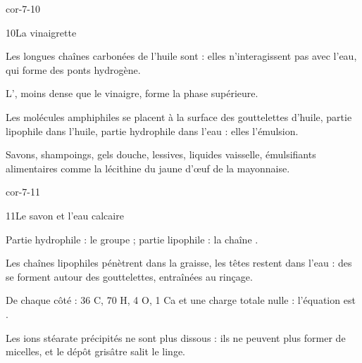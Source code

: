 \begin{blocLivre}{cor-7-10}
\begin{corrige}{10}{La vinaigrette}
\begin{questions}
\item Les longues chaînes carbonées de l'huile sont  : elles n'interagissent pas avec l'eau, qui forme des ponts
hydrogène.
\item L', moins dense que le vinaigre, forme la phase supérieure.
\item Les molécules amphiphiles se placent à la surface des gouttelettes d'huile, partie lipophile dans l'huile, partie
hydrophile dans l'eau : elles  l'émulsion.
\item Savons, shampoings, gels douche, lessives, liquides vaisselle, émulsifiants alimentaires comme la lécithine du jaune
d'œuf de la mayonnaise.
\end{questions}
\end{corrige}
\end{blocLivre}
\begin{blocLivre}{cor-7-11}
\begin{corrige}{11}{Le savon et l'eau calcaire}
\begin{questions}
\item Partie hydrophile : le groupe  ; partie lipophile : la chaîne .
\item Les chaînes lipophiles pénètrent dans la graisse, les têtes restent dans l'eau : des  se forment autour des
gouttelettes, entraînées au rinçage.
\item De chaque côté : 36 C, 70 H, 4 O, 1 Ca et une charge totale nulle : l'équation est .
\item Les ions stéarate précipités ne sont plus dissous : ils ne peuvent plus former de micelles, et le dépôt grisâtre
salit le linge.
\end{questions}
\end{corrige}
\end{blocLivre}
